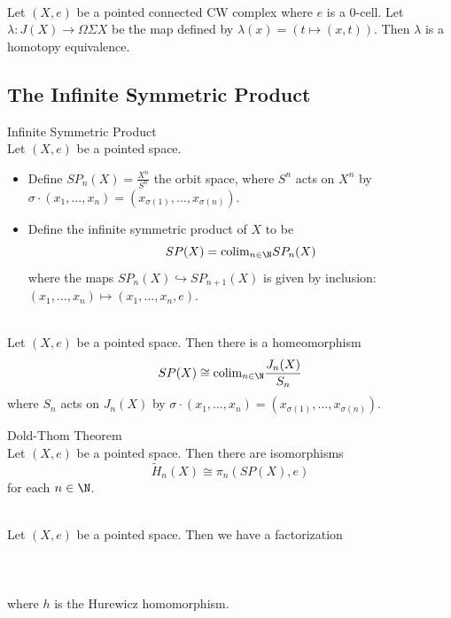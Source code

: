 \documentclass[a4paper]{article}
\begin{document}
\begin{prp}{}{}\\
Let $(X,e)$ be a pointed connected CW complex where $e$ is a $0$-cell. Let $\lambda:J(X)\to\Omega\Sigma X$ be the map defined by $\lambda(x)=(t\mapsto(x,t))$. Then $\lambda$ is a homotopy equivalence. 
\end{prp}

\subsection{The Infinite Symmetric Product}
\begin{defn}{Infinite Symmetric Product}{}\\
Let $(X,e)$ be a pointed space. 
\begin{itemize}
\item Define $SP_n(X)=\frac{X^n}{S^n}$ the orbit space, where $S^n$ acts on $X^n$ by $\sigma\cdot(x_1,\dots,x_n)=(x_{\sigma(1)},\dots,x_{\sigma(n)})$. 
\item Define the infinite symmetric product of $X$ to be $$SP(X)=\text{colim}_{n\in\N}SP_n(X)$$ where the maps $SP_n(X)\hookrightarrow SP_{n+1}(X)$ is given by inclusion: $(x_1,\dots,x_n)\mapsto(x_1,\dots,x_n,e)$. 
\end{itemize}
\end{defn}

\begin{lmm}{}{}\\
Let $(X,e)$ be a pointed space. Then there is a homeomorphism $$SP(X)\cong\text{colim}_{n\in\N}\frac{J_n(X)}{S_n}$$ where $S_n$ acts on $J_n(X)$ by $\sigma\cdot(x_1,\dots,x_n)=(x_{\sigma(1)},\dots,x_{\sigma(n)})$. 
\end{lmm}

\begin{thm}{Dold-Thom Theorem}{}\\
Let $(X,e)$ be a pointed space. Then there are isomorphisms $$\widetilde{H}_n(X)\cong\pi_n(SP(X),e)$$ for each $n\in\N$. 
\end{thm}

\begin{prp}{}{}\\
Let $(X,e)$ be a pointed space. Then we have a factorization \\~\\
\\~\\
where $h$ is the Hurewicz homomorphism. 
\end{prp}
\end{document}
